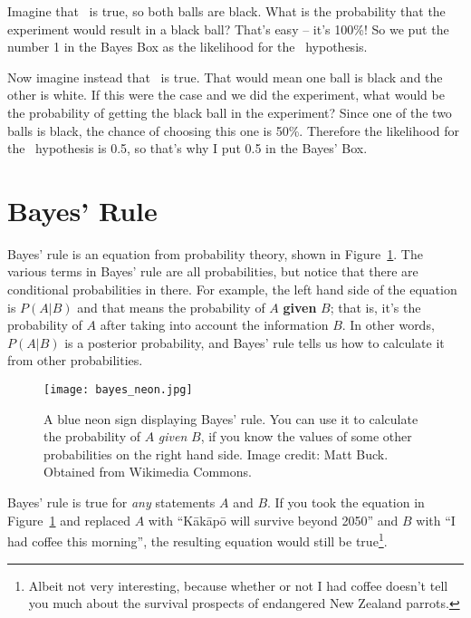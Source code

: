 Imagine that \bb~is true, so both balls are black. What is the probability that
the experiment would result in a black ball? That's easy -- it's 100\%! So we
put the number 1 in the Bayes Box as the likelihood for the \bb~hypothesis.

Now imagine instead that \bw~is true. That would mean one ball is black and the
other is white. If this were the case and we did the experiment, what would be
the probability of getting the black ball in the experiment? Since one of the
two balls is black, the chance of choosing this one is 50\%. Therefore the
likelihood for the \bw~hypothesis is 0.5, so that's why I put 0.5 in the Bayes'
Box.





\section{Bayes' Rule}
Bayes' rule is an equation from probability theory, shown in
Figure~\ref{fig:bayes_neon}. The various terms in Bayes' rule are all
probabilities, but notice that there are conditional probabilities in there.
For example, the left hand side of the equation is $P(A|B)$ and that means
the probability of $A$ {\bf given} $B$; that is, it's the probability of $A$
after taking into account the information $B$. In other words,
$P(A|B)$ is a posterior probability, and Bayes' rule tells us how to calculate
it from other probabilities.
\begin{figure}[h]
\begin{center}
\texttt{[image: bayes\_neon.jpg]}
\caption{A blue neon sign displaying Bayes' rule.
You can use it to calculate the probability of $A$ {\it given} $B$,
if you know the values of some other probabilities on the right hand side.
Image credit: Matt Buck. Obtained from Wikimedia Commons.
\label{fig:bayes_neon}}
\end{center}
\end{figure}
Bayes' rule is true for {\it any} statements $A$ and $B$. If you took the
equation in Figure~\ref{fig:bayes_neon} and replaced $A$ with
``K\={a}k\={a}p\={o} will survive beyond 2050'' and $B$ with
``I had coffee this morning'', the
resulting equation would still be true\footnote{Albeit not very interesting,
because
whether or not I had coffee doesn't tell you much about the survival prospects
of endangered New Zealand parrots.}.

